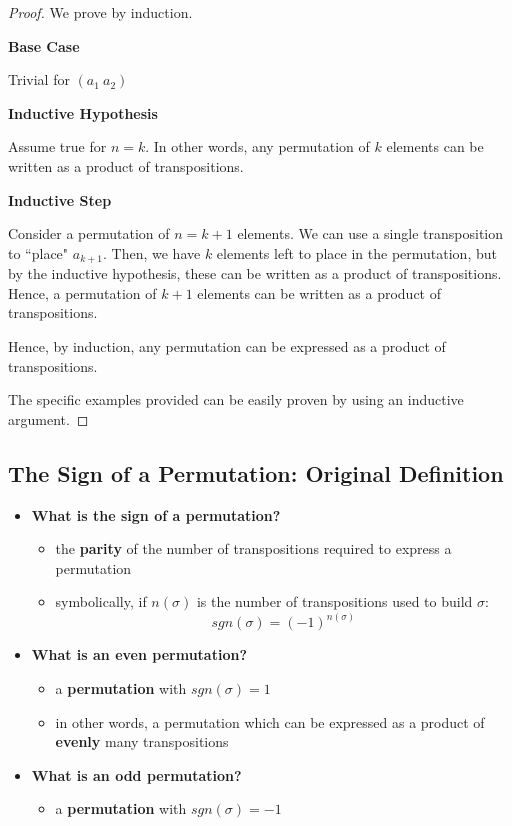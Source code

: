 \documentclass{exam}
\begin{document}
\begin{proof}

We prove by induction. 

\bigskip

 \textbf{Base Case} 

Trivial for $(a_1 \ a_2)$

\bigskip

 \textbf{Inductive Hypothesis}

Assume true for $n = k$. In other words, any permutation of $k$ elements can be written as a product of transpositions.

\bigskip

 \textbf{Inductive Step}

Consider a permutation of $n = k+1$ elements. We can use a single transposition to ``place" $a_{k+1}$. Then, we have $k$ elements left to place in the permutation, but by the inductive hypothesis, these can be written as a product of transpositions. Hence, a permutation of $k+1$ elements can be written as a product of transpositions.

\bigskip

Hence, by induction, any permutation can be expressed as a product of transpositions.

\bigskip

The specific examples provided can be easily proven by using an inductive argument.

\end{proof}

\subsection{The Sign of a Permutation: Original Definition}

\begin{itemize}
    \item \textbf{What is the sign of a permutation?}
    \begin{itemize}
        \item the \textbf{parity} of the number of transpositions required to express a permutation
        \item symbolically, if $n(\sigma)$ is the number of transpositions used to build $\sigma$:
        \[
        sgn(\sigma) = (-1)^{n(\sigma)}
        \]
    \end{itemize}
    \item \textbf{What is an even permutation?}
    \begin{itemize}
        \item a \textbf{permutation} with $sgn(\sigma) = 1$
        \item in other words, a permutation which can be expressed as a product of \textbf{evenly} many transpositions
    \end{itemize}
    \item \textbf{What is an odd permutation?}
    \begin{itemize}
        \item a \textbf{permutation} with $sgn(\sigma) = -1$
    \end{itemize}
\end{itemize}
\end{document}
